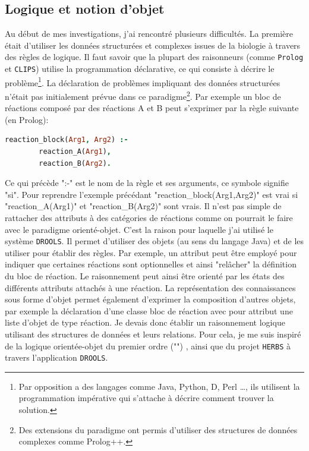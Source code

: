 \begin{refsegment}


\subsection{Logique et notion d'objet}

Au début de mes investigations, j'ai rencontré plusieurs difficultés. La première était d'utiliser les données structurées et complexes issues de la biologie à travers des règles de logique. Il faut savoir que la plupart des raisonneurs (comme \texttt{Prolog} et \texttt{CLIPS}) utilise la programmation déclarative, ce qui consiste à décrire le problème\footnote{Par opposition a des langages comme Java, Python, D, Perl \ldots, ils utilisent la programmation impérative qui s'attache à décrire comment trouver la solution.}. La déclaration de problèmes impliquant des données structurées n'était pas initialement prévue dans ce paradigme\footnote{Des extensions du paradigme ont permis d'utiliser des structures de données complexes comme Prolog++.}. Par exemple un bloc de réactions composé par des réactions A et B peut s'exprimer par la règle suivante (en Prolog):

\begin{lstlisting}[basicstyle=\small\normalfont\ttfamily,language=Prolog]
    reaction_block(Arg1, Arg2) :-
        reaction_A(Arg1),
        reaction_B(Arg2).
\end{lstlisting}

Ce qui précède  ":-" est le nom de la règle et ses arguments, ce symbole signifie "si". Pour reprendre l'exemple précédant "reaction\_block(Arg1,Arg2)" est vrai si "reaction\_A(Arg1)" et "reaction\_B(Arg2)" sont vrais. Il n'est pas simple de rattacher des attributs à des catégories de réactions comme on pourrait le faire avec le paradigme orienté-objet. C'est la raison pour laquelle j'ai utilisé le système \texttt{DROOLS}. Il permet d'utiliser des objets (au sens du langage Java)  et de les utiliser pour établir des règles. Par exemple, un attribut peut être employé pour indiquer que certaines réactions sont optionnelles et ainsi "relâcher" la définition du bloc de réaction. Le raisonnement peut ainsi être orienté par les états des différents attributs attachés à une réaction. La représentation des connaissances sous forme d'objet permet également d'exprimer la composition d'autres objets, par exemple la déclaration d'une classe bloc de réaction avec pour attribut une liste d'objet de type réaction. Je devais donc établir un raisonnement logique utilisant des structures de données et leurs relations. Pour cela, je me suis inspiré de la logique orientée-objet du premier ordre ("") \cite{amir1999object}, ainsi que du projet \texttt{\gls{HERBS}} à travers l'application \texttt{DROOLS}.


\end{refsegment}
